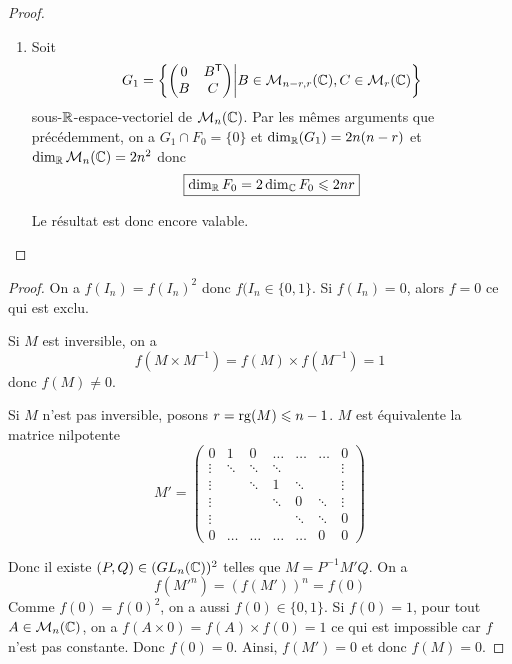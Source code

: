 \begin{proof}
\begin{enumerate}
        \item Soit 
        \begin{equation}
            G_{1}=\left\lbrace\begin{pmatrix}
                0 & B^{\mathsf{T}}\\
                B & C
            \end{pmatrix}\middle| B\in\mathcal{M}_{n-r,r}(\mathbb{C}),C\in\mathcal{M}_{r}(\mathbb{C})\right\rbrace
        \end{equation}
        sous-$\mathbb{R}$-espace-vectoriel de $\mathcal{M}_{n}(\mathbb{C})$. Par les mêmes arguments que précédemment, on a $G_{1}\cap F_{0}=\lbrace0\rbrace$ et $\dim_{\mathbb{R}}(G_{1})=2n(n-r)$ et $\dim_{\mathbb{R}}\mathcal{M}_{n}(\mathbb{C})=2n^{2}$ donc 
        \begin{equation}
            \boxed{\dim_{\mathbb{R}}F_{0}=2\dim_{\mathbb{C}}F_{0}\leqslant 2nr}
        \end{equation}

        Le résultat est donc encore valable.
    \end{enumerate}
\end{proof}

\begin{proof}
    On a $f(I_{n})=f(I_{n})^{2}$ donc $f(I_{n}\in\lbrace0,1\rbrace$. Si $f(I_{n})=0$, alors $f=0$ ce qui est exclu.

    Si $M$ est inversible, on a 
    \begin{equation}
        f(M\times M^{-1})=f(M)\times f(M^{-1})=1
    \end{equation}
    donc $f(M)\neq0$.

    Si $M$ n'est pas inversible, posons $r=\operatorname{rg}(M)\leqslant n-1$. $M$ est équivalente la matrice nilpotente
    \begin{equation}
        M'=
        \begin{pmatrix}
            0 & 1 & 0 &\dots & \dots&\dots & 0\\
            \vdots & \ddots & \ddots & \ddots& & &\vdots\\
            \vdots & &\ddots & 1 & \ddots &&\vdots\\
            \vdots & && \ddots & 0 &\ddots &\vdots\\
            \vdots & & & &\ddots & \ddots & 0\\
            0 &\dots & \dots & \dots & \dots &0&0
        \end{pmatrix}
    \end{equation}

    Donc il existe $(P,Q)\in (GL_{n}(\mathbb{C}))^{2}$ telles que $M=P^{-1}M'Q$. On a
    \begin{equation}
        f(M'^{n})=\left(f(M')\right)^{n}=f(0)
    \end{equation}
    Comme $f(0)=f(0)^{2}$, on a aussi $f(0)\in\lbrace0,1\rbrace$. Si $f(0)=1$, pour tout $A\in\mathcal{M}_{n}(\mathbb{C})$, on a $f(A\times 0)=f(A)\times f(0)=1$ ce qui est impossible car $f$ n'est pas constante. Donc $f(0)=0$. Ainsi, $f(M')=0$ et donc $f(M)=0$.
\end{proof}

